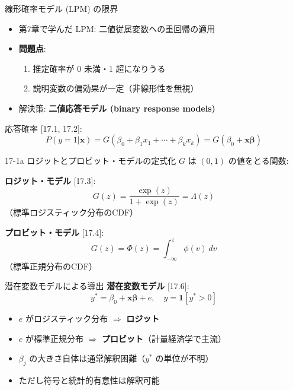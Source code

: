 \documentclass[
  ignorenonframetext,
]{beamer}
\providecommand{\tightlist}{%
  \setlength{\itemsep}{0pt}\setlength{\parskip}{0pt}}
\begin{document}
\begin{frame}{線形確率モデル (LPM) の限界}
\protect\hypertarget{ux7ddaux5f62ux78baux7387ux30e2ux30c7ux30eb-lpm-ux306eux9650ux754c}{}
\begin{itemize}
\tightlist
\item
  第7章で学んだ LPM: 二値従属変数への重回帰の適用
\item
  \textbf{問題点}:

  \begin{enumerate}
  \tightlist
  \item
    推定確率が 0 未満・1 超になりうる
  \item
    説明変数の偏効果が一定（非線形性を無視）
  \end{enumerate}
\item
  解決策: \textbf{二値応答モデル (binary response models)}
\end{itemize}

応答確率 {[}17.1, 17.2{]}:
\[P(y = 1|\mathbf{x}) = G(\beta_0 + \beta_1 x_1 + \cdots + \beta_k x_k) = G(\beta_0 + \mathbf{x\beta})\]
\end{frame}

\begin{frame}{17-1a ロジットとプロビット・モデルの定式化}
\protect\hypertarget{a-ux30edux30b8ux30c3ux30c8ux3068ux30d7ux30edux30d3ux30c3ux30c8ux30e2ux30c7ux30ebux306eux5b9aux5f0fux5316}{}
\(G\) は \((0,1)\) の値をとる関数:

\textbf{ロジット・モデル} {[}17.3{]}:
\[G(z) = \frac{\exp(z)}{1 + \exp(z)} = \Lambda(z)\]
（標準ロジスティック分布のCDF）

\textbf{プロビット・モデル} {[}17.4{]}:
\[G(z) = \Phi(z) = \int_{-\infty}^{z} \phi(v)\,dv\]
（標準正規分布のCDF）
\end{frame}

\begin{frame}{潜在変数モデルによる導出}
\protect\hypertarget{ux6f5cux5728ux5909ux6570ux30e2ux30c7ux30ebux306bux3088ux308bux5c0eux51fa}{}
\textbf{潜在変数モデル} {[}17.6{]}:
\[y^* = \beta_0 + \mathbf{x\beta} + e, \quad y = \mathbf{1}[y^* > 0]\]

\begin{itemize}
\tightlist
\item
  \(e\) がロジスティック分布 \(\Rightarrow\) \textbf{ロジット}
\item
  \(e\) が標準正規分布 \(\Rightarrow\)
  \textbf{プロビット}（計量経済学で主流）
\item
  \(\beta_j\) の大きさ自体は通常解釈困難（\(y^*\) の単位が不明）
\item
  ただし符号と統計的有意性は解釈可能
\end{itemize}
\end{frame}
\end{document}

